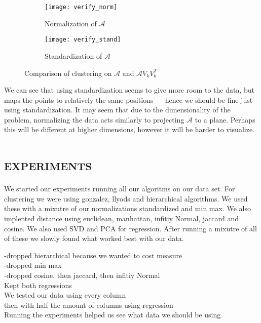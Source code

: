 \documentclass[a4paper, 11pt]{article} %
\begin{document}
\begin{figure}[H]
\centering
\begin{subfigure}{.4\textwidth}
  \centering
  \texttt{[image: verify\_norm]}
  \caption{Normalization of $\mathcal{A}$}
  \label{verify_norm}
\end{subfigure}%
\begin{subfigure}{.7\textwidth}
  \centering
  \texttt{[image: verify\_stand]}
  \caption{Standardization of $\mathcal{A}$}
  \label{verify_stand}
\end{subfigure}
\caption{Comparison of clustering on $\mathcal{A}$ and $\mathcal{A}V_kV_k^T$}
\label{normalizations}
\end{figure}
We can see that using standardization seems to give more room to the data, but maps the points to relatively the same positions --- hence we should be fine just using standardization. It may seem that due to the dimensionality of the problem, normalizing the data acts similarly to projecting $\mathcal{A}$ to a plane. Perhaps this will be different at higher dimensions, however it will be harder to visualize. 


\section{\textsc{experiments}}

We started our experiments running all our algoritms on our data set. For clustering we were using gonzalez, llyods and hierarchical algorithms. We used these with a mixutre of our normalizations standardized and min max. We also implented distance using euclidean, manhattan, infitiy Normal, jaccard and cosine. We also used SVD and PCA for regression. After running a mixutre of all of these we slowly found what worked best with our data.


-dropped hierarchical because we wanted to cost measure\\
-dropped min max\\
-dropped cosine, then jaccard, then infitiy Normal\\

Kept both regressions\\

We tested our data using every column\\
then with half the amount of columns using regression\\

Running the experiments helped us see what data we should be using\\
\end{document}
